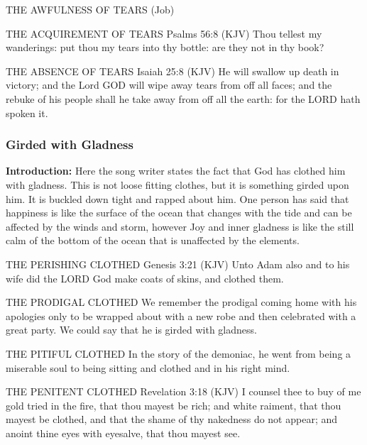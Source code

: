\begin{compactenum}
    \item THE AWFULNESS OF TEARS (Job)
    \item THE ACQUIREMENT OF TEARS
Psalms 56:8 (KJV)  Thou tellest my wanderings: put thou my tears into thy bottle: are they not in thy book?
    \item THE ABSENCE OF TEARS
Isaiah 25:8 (KJV)  He will swallow up death in victory; and the Lord GOD will wipe away tears from off all faces; and the rebuke of his people shall he take away from off all the earth: for the LORD hath spoken it.
\end{compactenum}




\subsubsection{Girded with Gladness}

\textbf{Introduction: }Here the song writer states the fact that God has clothed him with gladness. This is not loose fitting clothes, but it is something girded upon him. It is buckled down tight and rapped about him. One person has said that happiness is like the surface of the ocean that changes with the tide and can be affected by the winds and storm, however Joy and inner gladness is like the still calm of the bottom of the ocean that is unaffected by the elements.\\

\begin{compactenum}
    \item THE PERISHING CLOTHED
Genesis 3:21 (KJV)  Unto Adam also and to his wife did the LORD God make coats of skins, and clothed them.
    \item THE PRODIGAL CLOTHED
We remember the prodigal coming home with his apologies only to be wrapped about with a new robe and then celebrated with a great party. We could say that he is girded with gladness.
    \item THE PITIFUL CLOTHED
In the story of the demoniac, he went from being a miserable soul to being sitting and clothed and in his right mind.
    \item THE PENITENT CLOTHED
Revelation 3:18 (KJV)  I counsel thee to buy of me gold tried in the fire, that thou mayest be rich; and white raiment, that thou mayest be clothed, and that the shame of thy nakedness do not appear; and anoint thine eyes with eyesalve, that thou mayest see.
\end{compactenum}


